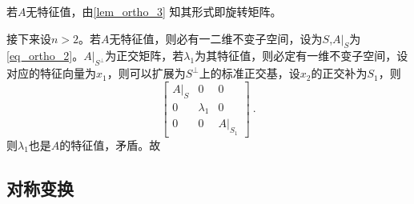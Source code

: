 若$A$无特征值，由\autoref{lem_ortho_3} 知其形式即旋转矩阵。

接下来设$n>2$。若$A$无特征值，则必有一二维不变子空间，设为$S$,$A|_{S}$为\autoref{eq_ortho_2}。$A|_{S^{\bot}}$为正交矩阵，若$\lambda_1$为其特征值，则必定有一维不变子空间，设对应的特征向量为$x_1$，则可以扩展为$S^{\bot}$上的标准正交基，设$x_2$的正交补为$S_1$，则
\begin{equation}
\left[\begin{array}{rrr}
A|_{S}&0&0\\
0&\lambda_1&0\\
0&0&A|_{S_1}
\end{array}
\right]~.
\end{equation}
则$\lambda_1$也是$A$的特征值，矛盾。故
\subsection{对称变换}


